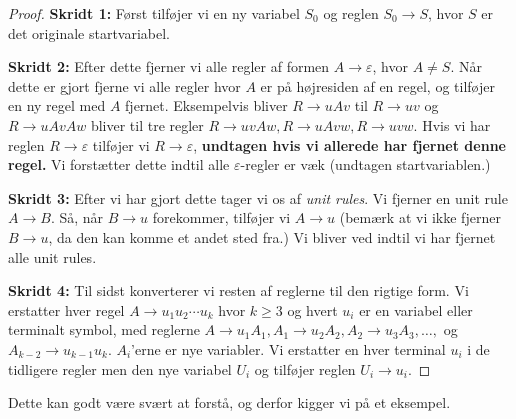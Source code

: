 \begin{proof}
  \noindent
  \textbf{\large Skridt 1:} Først tilføjer vi en ny variabel $S_{0}$ og reglen $S_{0} \rightarrow S$, hvor $S$ er det originale startvariabel.

  \noindent
  \textbf{\large Skridt 2:} Efter dette fjerner vi alle regler af formen $A \rightarrow \varepsilon$, hvor $A \neq S$. Når dette er gjort fjerne vi alle regler hvor $A$ er på højresiden af en regel, og tilføjer en ny regel med $A$ fjernet. Eksempelvis bliver $R \rightarrow uAv$ til $R \rightarrow uv$ og $R \rightarrow uAvAw$ bliver til tre regler $R \rightarrow uvAw, R \rightarrow uAvw, R \rightarrow uvw$. Hvis vi har reglen $R \rightarrow \varepsilon$ tilføjer vi $R \rightarrow \varepsilon$, \textbf{undtagen hvis vi allerede har fjernet denne regel.} Vi forstætter dette indtil alle $\varepsilon$-regler er væk (undtagen startvariablen.)

  \noindent
  \textbf{\large Skridt 3:} Efter vi har gjort dette tager vi os af \textit{unit rules}. Vi fjerner en unit rule $A \rightarrow B$. Så, når $B \rightarrow u$ forekommer, tilføjer vi $A \rightarrow u$ (bemærk at vi ikke fjerner $B \rightarrow u$, da den kan komme et andet sted fra.) Vi bliver ved indtil vi har fjernet alle unit rules.

  \noindent
  \textbf{\large Skridt 4:} Til sidst konverterer vi resten af reglerne til den rigtige form. Vi erstatter hver regel $A \rightarrow u_{1}u_{2} \cdots u_{k}$ hvor $k \geq 3$ og hvert $u_{i}$ er en variabel eller terminalt symbol, med reglerne $A \rightarrow u_{1}A_{1}, A_{1} \rightarrow u_{2}A_{2}, A_{2} \rightarrow u_{3}A_{3}, \ldots, $ og $A_{k-2} \rightarrow u_{k-1}u_{k}$.  $A_{i}$'erne er nye variabler. Vi erstatter en hver terminal $u_{i}$ i de tidligere regler men den nye variabel $U_{i}$ og tilføjer reglen $U_{i} \rightarrow u_{i}$.
\end{proof}

Dette kan godt være svært at forstå, og derfor kigger vi på et eksempel.

